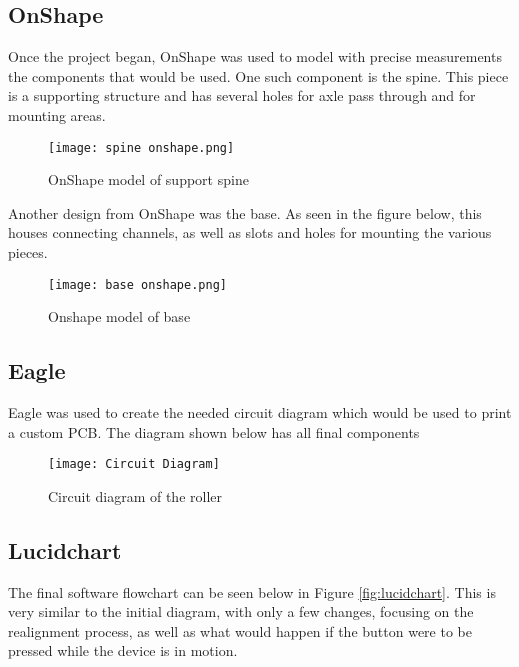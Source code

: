 \documentclass[12pt]{article}
\begin{document}
\subsection{OnShape} 
Once the project began, OnShape was used to model with precise measurements the components that would be used. One such component is the spine. This piece is a supporting structure and has several holes for axle pass through and for mounting areas.
\begin{figure}[H]
\centering
    \texttt{[image: spine onshape.png]}
    \caption{OnShape model of support spine}
    \label{fig:spine}
\end{figure}

Another design from OnShape was the base. As seen in the figure below, this houses connecting channels, as well as slots and holes for mounting the various pieces.
\begin{figure}[H]
\centering
    \texttt{[image: base onshape.png]}
    \caption{Onshape model of base}
    \label{fig:base}
\end{figure}

\subsection{Eagle}
Eagle was used to create the needed circuit diagram which would be used to print a custom PCB. The diagram shown below has all final components
\begin{figure}[H]
\centering
    \texttt{[image: Circuit Diagram]}
    \caption{Circuit diagram of the roller}
    \label{fig:circuit diagram}
\end{figure}

\subsection{Lucidchart}
The final software flowchart can be seen below in Figure \ref{fig:lucidchart}. This is very similar to the initial diagram, with only a few changes, focusing on the realignment process, as well as what would happen if the button were to be pressed while the device is in motion.
\end{document}
